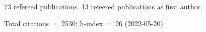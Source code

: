 73 refereed publications. 13 refeered publications as first author.

Total citations~=~2530; h-index~=~26 (2022-05-20)